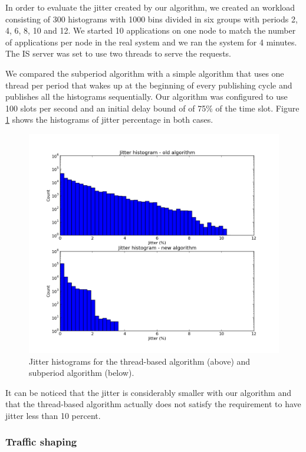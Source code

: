In order to evaluate the jitter created by our algorithm, we created an workload consisting of 300 histograms with 1000 bins divided in six groups with periods 2, 4, 6, 8, 10 and 12. We started 10 applications on one node to match the number of applications per node in the real system and we ran the system for 4 minutes. The IS server was set to use two threads to serve the requests.

We compared the subperiod algorithm with a simple algorithm that uses one thread per period that wakes up at the beginning of every publishing cycle and publishes all the histograms sequentially. Our algorithm was configured to use 100 slots per second and an initial delay bound of of 75\% of the time slot. Figure \ref{fig:jitter_histo} shows the histograms of jitter percentage in both cases.

\begin{figure}[ht]
\centering
\includegraphics[scale=0.55]{Images/jitter_histo.png}
\caption[Jitter histograms.]{Jitter histograms for the thread-based algorithm (above) and subperiod algorithm (below).}
\label{fig:jitter_histo}
\end{figure}

It can be noticed that the jitter is considerably smaller with our algorithm and that the thread-based algorithm actually does not satisfy the requirement to have jitter less than 10 percent.

\subsubsection*{Traffic shaping}

